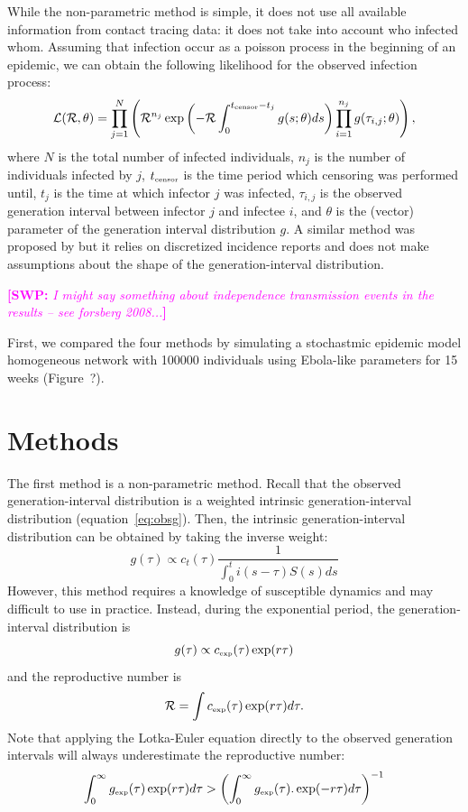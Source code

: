 \documentclass{article}
\newcommand{\RR}{\ensuremath{{\mathcal R}}}
\newcommand{\tsub}[2]{#1_{{\textrm{\tiny #2}}}}
\newcommand{\comment}[3]{\textcolor{#1}{\textbf{[#2: }\textsl{#3}\textbf{]}}}
\newcommand{\swp}[1]{\comment{magenta}{SWP}{#1}}
\begin{document}
While the non-parametric method is simple, it does not use all available information from contact tracing data: it does not take into account who infected whom.
Assuming that infection occur as a poisson process in the beginning of an epidemic, we can obtain the following likelihood for the observed infection process:
\begin{equation}
\mathcal{L}(\RR, \theta) = \prod_{j=1}^N \left(\RR^{n_j} \exp \left(- \RR \int_0^{\tsub{t}{censor} - t_j} g(s;\theta) ds \right) \prod_{i=1}^{n_j} g(\tau_{i, j}; \theta) \right),
\end{equation}
where $N$ is the total number of infected individuals, $n_j$ is the number of individuals infected by $j$, $\tsub{t}{censor}$ is the time period which censoring was performed until, $t_j$ is the time at which infector $j$ was infected, $\tau_{i,j}$ is the observed generation interval between infector $j$ and infectee $i$, and $\theta$ is the (vector) parameter of the generation interval distribution $g$.
A similar method was proposed by \cite{forsberg2008likelihood} but it relies on discretized incidence reports and does not make assumptions about the shape of the generation-interval distribution.

\swp{I might say something about independence transmission events in the results -- see forsberg 2008...}

First, we compared the four methods by simulating a stochastmic epidemic model homogeneous network with 100000 individuals using Ebola-like parameters for 15 weeks (Figure~?).




\section{Methods}

The first method is a non-parametric method.
Recall that the observed generation-interval distribution is a weighted intrinsic generation-interval distribution (equation~\ref{eq:obsg}). 
Then, the intrinsic generation-interval distribution can be obtained by taking the inverse weight:
\begin{equation}
g(\tau) \propto c_t(\tau) \frac{1}{\int_{0}^t i(s-\tau) S(s) ds}
\end{equation}
However, this method requires a knowledge of susceptible dynamics and may difficult to use in practice.
Instead, during the exponential period, the generation-interval distribution is
\begin{equation}
g(\tau) \propto \tsub{c}{exp}(\tau) \exp(r\tau)
\end{equation}
and the reproductive number is
\begin{equation}
\RR = \int \tsub{c}{exp}(\tau) \exp(r\tau) d\tau.
\end{equation}
Note that applying the Lotka-Euler equation directly to the observed generation intervals will always underestimate the reproductive number:
\begin{equation}
\int_0^\infty \tsub{g}{exp}(\tau) \exp(r\tau) d\tau > \left(\int_0^\infty \tsub{g}{exp}(\tau). \exp(-r\tau) d\tau\right)^{-1}
\end{equation}
\end{document}
